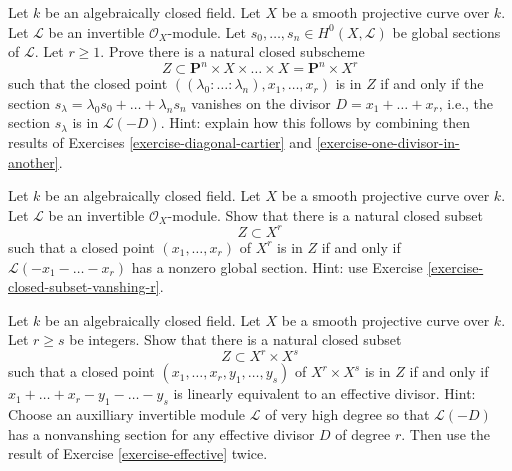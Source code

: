 \begin{exercise}
\label{exercise-closed-subset-vanshing-r}
Let $k$ be an algebraically closed field. Let $X$ be a smooth projective curve
over $k$. Let $\mathcal{L}$ be an invertible $\mathcal{O}_X$-module.
Let $s_0, \ldots, s_n \in H^0(X, \mathcal{L})$
be global sections of $\mathcal{L}$. Let $r \geq 1$.
Prove there is a natural closed subscheme
$$
Z \subset
\mathbf{P}^n \times X \times \ldots \times X = \mathbf{P}^n \times X^r
$$
such that the closed point
$((\lambda_0 : \ldots : \lambda_n), x_1, \ldots, x_r)$
is in $Z$ if and only if the section
$s_\lambda = \lambda_0 s_0 + \ldots + \lambda_n s_n$
vanishes on the divisor $D = x_1 + \ldots + x_r$, i.e.,
the section $s_\lambda$ is in $\mathcal{L}(-D)$.
Hint: explain how this follows by combining then results of
Exercises \ref{exercise-diagonal-cartier} and
\ref{exercise-one-divisor-in-another}.
\end{exercise}

\begin{exercise}
\label{exercise-effective}
Let $k$ be an algebraically closed field. Let $X$ be a smooth projective curve
over $k$. Let $\mathcal{L}$ be an invertible $\mathcal{O}_X$-module.
Show that there is a natural closed subset
$$
Z \subset X^r
$$
such that a closed point $(x_1, \ldots, x_r)$ of $X^r$ is in $Z$
if and only if $\mathcal{L}(-x_1 - \ldots -x_r)$ has a nonzero
global section. Hint: use Exercise \ref{exercise-closed-subset-vanshing-r}.
\end{exercise}

\begin{exercise}
\label{exercise-difference-effective}
Let $k$ be an algebraically closed field. Let $X$ be a smooth projective curve
over $k$. Let $r \geq s$ be integers. Show that there is a natural closed
subset
$$
Z \subset X^r \times X^s
$$
such that a closed point $(x_1, \ldots, x_r, y_1, \ldots, y_s)$ of
$X^r \times X^s$ is in $Z$
if and only if $x_1 + \ldots + x_r - y_1 - \ldots - y_s$
is linearly equivalent to an effective divisor.
Hint: Choose an auxilliary invertible module $\mathcal{L}$
of very high degree so that $\mathcal{L}(-D)$ has a nonvanshing
section for any effective divisor $D$ of degree $r$.
Then use the result of Exercise \ref{exercise-effective} twice.
\end{exercise}

